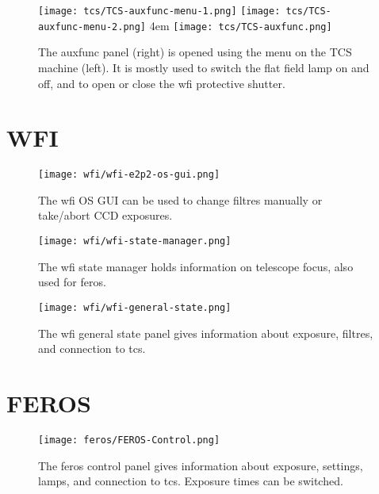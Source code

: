 \documentclass[11pt,fleqn]{book} %
\begin{document}
\begin{figure}[!ht]
\centering
\texttt{[image: tcs/TCS-auxfunc-menu-1.png]}%
\texttt{[image: tcs/TCS-auxfunc-menu-2.png]}
\hglue 4em
\texttt{[image: tcs/TCS-auxfunc.png]}
\caption[Auxiliary functions of the telescope control software]{The \gls{auxfunc} panel (right) is opened using the menu
on the TCS machine (left). It is mostly used to switch the flat field 
lamp on and off, and to open or close the \gls{wfi} protective shutter.}
\label{fig:tcsauxfunc}
\end{figure}

\section{WFI}

\begin{figure}[!ht]
\centering
\texttt{[image: wfi/wfi-e2p2-os-gui.png]}
\caption[WFI OS GUI]{The \gls{wfi} OS GUI can be used to change filtres manually or
take/abort CCD exposures.}
\label{fig:wfios}
\end{figure}

\begin{figure}[!ht]
\centering
\texttt{[image: wfi/wfi-state-manager.png]}
\caption[WFI state manager]{The \gls{wfi} state manager holds information on telescope
focus, also used for \gls{feros}.}
\label{fig:wfistate}
\end{figure}

\begin{figure}[!ht]
\centering
\texttt{[image: wfi/wfi-general-state.png]}
\caption[WFI general state panel]{The \gls{wfi} general state panel gives information
about exposure, filtres, and connection to \gls{tcs}.}
\label{fig:wfigen}
\end{figure}

\section{FEROS}

\begin{figure}[!ht]
\centering
\texttt{[image: feros/FEROS-Control.png]}
\caption[FEROS control panel]{The \gls{feros} control panel gives information
about exposure, settings, lamps, and connection to \gls{tcs}.  Exposure times
can be switched.}
\label{fig:feroscon}
\end{figure}
\end{document}
